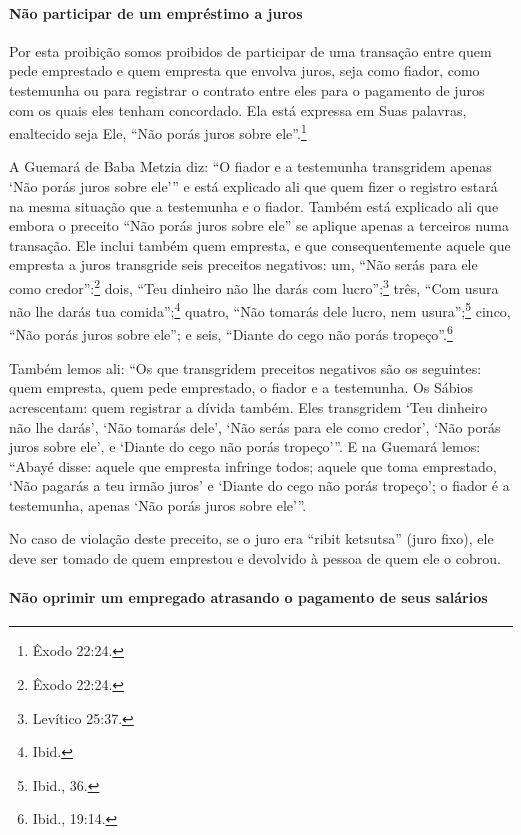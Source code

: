 \paragraph{Não participar de um empréstimo a juros}

Por esta proibição somos proibidos de participar de uma transação entre
quem pede emprestado e quem empresta que envolva juros, seja como
fiador, como testemunha ou para registrar o contrato entre eles para o
pagamento de juros com os quais eles tenham concordado. Ela está
expressa em Suas palavras, enaltecido seja Ele, ``Não porás juros sobre
ele''.\footnote{Êxodo 22:24.}

A Guemará de Baba Metzia diz: ``O fiador e a testemunha transgridem
apenas `Não porás juros sobre ele''' e está explicado ali que quem fizer
o registro estará na mesma situação que a testemunha e o fiador. Também
está explicado ali que embora o preceito ``Não porás juros sobre ele''
se aplique apenas a terceiros numa transação. Ele inclui também quem
empresta, e que consequentemente aquele que empresta a juros transgride
seis preceitos negativos: um, ``Não serás para ele como credor'':\footnote{Êxodo
22:24.} dois, ``Teu dinheiro não lhe darás com lucro'';\footnote{Levítico
25:37.} três, ``Com usura não lhe darás tua comida'';\footnote{Ibid.} quatro,
``Não tomarás dele lucro, nem usura'';\footnote{Ibid., 36.} cinco, ``Não porás
juros sobre ele''; e seis, ``Diante do cego não porás tropeço''.\footnote{Ibid.,
19:14.}

Também lemos ali: ``Os que transgridem preceitos negativos são os
seguintes: quem empresta, quem pede emprestado, o fiador e a testemunha.
Os Sábios acrescentam: quem registrar a dívida também. Eles transgridem
`Teu dinheiro não lhe darás', `Não tomarás dele', `Não serás para ele
como credor', `Não porás juros sobre ele', e `Diante do cego não porás
tropeço'''. E na Guemará lemos: ``Abayé disse: aquele que empresta
infringe todos; aquele que toma emprestado, `Não pagarás a teu irmão
juros' e `Diante do cego não porás tropeço'; o fiador é a testemunha,
apenas `Não porás juros sobre ele'''.

No caso de violação deste preceito, se o juro era ``ribit ketsutsa''
(juro fixo), ele deve ser tomado de quem emprestou e devolvido à pessoa
de quem ele o cobrou.

\paragraph{Não oprimir um empregado atrasando o pagamento de seus salários}

